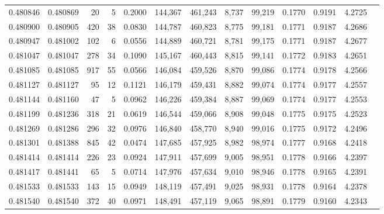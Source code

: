 \begin{tabular}{rrrrrrrrrrrrr}
0.480846 & 0.480869 &    20 &     5 &                                     0.2000 & 144,367 & 461,243 &   8,737 &  99,219 & 0.1770 & 0.9191 & 4.2725 \\
0.480900 & 0.480905 &   420 &    38 &                                     0.0830 & 144,787 & 460,823 &   8,775 &  99,181 & 0.1771 & 0.9187 & 4.2686 \\
0.480947 & 0.481002 &   102 &     6 &                                     0.0556 & 144,889 & 460,721 &   8,781 &  99,175 & 0.1771 & 0.9187 & 4.2677 \\
0.481047 & 0.481047 &   278 &    34 &                                     0.1090 & 145,167 & 460,443 &   8,815 &  99,141 & 0.1772 & 0.9183 & 4.2651 \\
0.481085 & 0.481085 &   917 &    55 &                                     0.0566 & 146,084 & 459,526 &   8,870 &  99,086 & 0.1774 & 0.9178 & 4.2566 \\
0.481127 & 0.481127 &    95 &    12 &                                     0.1121 & 146,179 & 459,431 &   8,882 &  99,074 & 0.1774 & 0.9177 & 4.2557 \\
0.481144 & 0.481160 &    47 &     5 &                                     0.0962 & 146,226 & 459,384 &   8,887 &  99,069 & 0.1774 & 0.9177 & 4.2553 \\
0.481199 & 0.481236 &   318 &    21 &                                     0.0619 & 146,544 & 459,066 &   8,908 &  99,048 & 0.1775 & 0.9175 & 4.2523 \\
0.481269 & 0.481286 &   296 &    32 &                                     0.0976 & 146,840 & 458,770 &   8,940 &  99,016 & 0.1775 & 0.9172 & 4.2496 \\
0.481301 & 0.481388 &   845 &    42 &                                     0.0474 & 147,685 & 457,925 &   8,982 &  98,974 & 0.1777 & 0.9168 & 4.2418 \\
0.481414 & 0.481414 &   226 &    23 &                                     0.0924 & 147,911 & 457,699 &   9,005 &  98,951 & 0.1778 & 0.9166 & 4.2397 \\
0.481417 & 0.481441 &    65 &     5 &                                     0.0714 & 147,976 & 457,634 &   9,010 &  98,946 & 0.1778 & 0.9165 & 4.2391 \\
0.481533 & 0.481533 &   143 &    15 &                                     0.0949 & 148,119 & 457,491 &   9,025 &  98,931 & 0.1778 & 0.9164 & 4.2378 \\
0.481540 & 0.481540 &   372 &    40 &                                     0.0971 & 148,491 & 457,119 &   9,065 &  98,891 & 0.1779 & 0.9160 & 4.2343 \\

\end{tabular}
